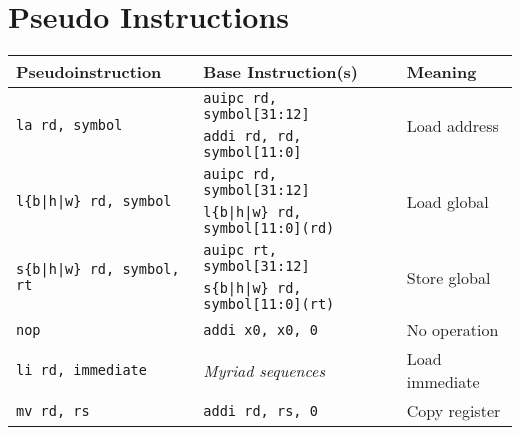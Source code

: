 \section*{Pseudo Instructions}
\small
\begin{tabular}{l l l}
Pseudoinstruction & Base Instruction(s) & Meaning \\ \hline

\multirow{2}{*}{\tt la rd, symbol} & {\tt auipc rd, symbol[31:12]} & \multirow{2}{*}{Load address} \\
                                   & {\tt addi rd, rd, symbol[11:0]} \\
\multirow{2}{*}{\tt l\{b|h|w\} rd, symbol} & {\tt auipc rd, symbol[31:12]} & \multirow{2}{*}{Load global} \\
                                           & {\tt l\{b|h|w\} rd, symbol[11:0](rd)} \\
\multirow{2}{*}{\tt s\{b|h|w\} rd, symbol, rt} & {\tt auipc rt, symbol[31:12]} & \multirow{2}{*}{Store global} \\
                                               & {\tt s\{b|h|w\} rd, symbol[11:0](rt)} \\
\hline
{\tt nop} & {\tt addi x0, x0, 0} & No operation \\
{\tt li rd, immediate} & {\em Myriad sequences} & Load immediate \\
{\tt mv rd, rs} & {\tt addi rd, rs, 0} & Copy register \\

\end{tabular}
